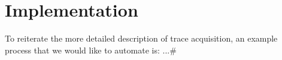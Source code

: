 
\chapter{Implementation}
\label{Chapter4}
To reiterate the more detailed description of trace acquisition, an
example process that we would like to automate is: ...\#
